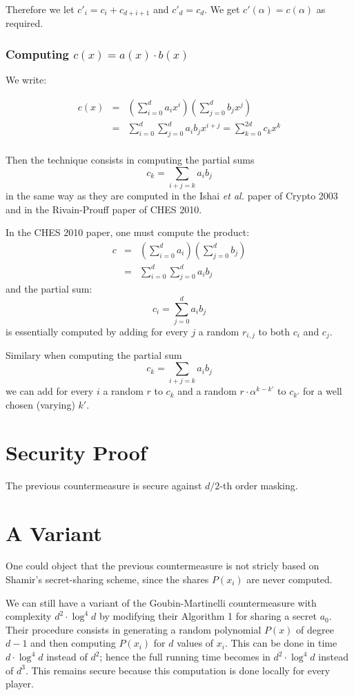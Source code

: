 \documentclass[11pt]{article}
\begin{document}
Therefore we let $c'_i=c_i+c_{d+i+1}$ and $c'_d=c_d$. We get
$c'(\alpha)=c(\alpha)$ as required.

\subsubsection{Computing $c(x)=a(x) \cdot b(x)$}

We write:

\begin{eqnarray*}
c(x) & =& \left(\sum\limits_{i=0}^d a_i x^i \right)
\left(\sum\limits_{j=0}^d b_j x^j \right) \\
& = & \sum\limits_{i=0}^d \sum\limits_{j=0}^d a_i b_j
x^{i+j}=\sum\limits_{k=0}^{2d} c_k x^k\\
\end{eqnarray*}

Then the technique consists in computing the partial sums
$$ c_k=\sum\limits_{i+j=k} a_i b_j $$
in the same way as they are computed in the Ishai {\sl et al.} paper
of Crypto 2003 and in the Rivain-Prouff paper of CHES 2010. 

In the CHES 2010 paper, one must compute the product:
\begin{eqnarray*}
 c&=&\left(\sum\limits_{i=0}^d a_i  \right)
\left(\sum\limits_{j=0}^d b_j  \right) \\
& = & \sum\limits_{i=0}^d \sum\limits_{j=0}^d a_i b_j
\end{eqnarray*}
and the partial sum:
$$c_i=\sum\limits_{j=0}^d a_i b_j$$
is essentially computed by adding for every $j$ a  random
$r_{i,j}$ to both $c_i$ 
and $c_j$. 

Similary when computing the partial sum
$$ c_k=\sum\limits_{i+j=k} a_i b_{j} $$
we can add for every $i$ a random $r$ to $c_k$ and a random $r \cdot
\alpha^{k-k'}$ to $c_{k'}$ for a well chosen (varying) $k'$.  

\section{Security Proof}

The previous countermeasure is secure against $d/2$-th order masking.

\section{A Variant}

One could object that the previous countermeasure is not stricly based
on Shamir's secret-sharing scheme, since the shares $P(x_i)$ are never
computed. 

We can still have a variant of the Goubin-Martinelli countermeasure
with complexity $d^2 \cdot \log^4 d$ by modifying their Algorithm 1
for sharing a secret $a_0$. Their procedure consists in generating a
random polynomial $P(x)$ of degree $d-1$ and then computing $P(x_i)$ for
$d$ values of $x_i$. This can be done in time $d \cdot \log^4 d$
instead of $d^2$; hence the full running time becomes in $d^2 \cdot
\log^4 d$ instead of $d^3$. This remains secure because this
computation is done locally for every player.
\end{document}
